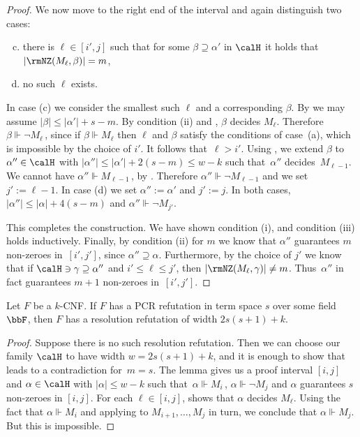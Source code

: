 \begin{proof}
We now move to the right end of the interval and 
again distinguish two cases:
\begin{enumerate}[(a)]\setcounter{enumi}{2}
\item there is $\ell \in [i',j]$ such that for some $\beta \supseteq \alpha'$ 
in $\calH$ it holds that $|\rmNZ(M_\ell, \beta)| = m$,
\item no such $\ell$ exists.
\end{enumerate}
In case (c) we consider the smallest such $\ell$ and a corresponding $\beta$.
By  we may assume $|\beta| \le |\alpha'|+s-m$.
By condition (ii) and , $\beta$ decides $M_{\ell}$.
Therefore $\beta \Vdash \neg M_{\ell}$\,, since if 
$\beta \Vdash M_{\ell}$ then $\ell$ and $\beta$ satisfy the conditions
of case~(a), which is impossible by the choice of $i'$.
It follows that~$\ell > i'$. 
Using , we extend $\beta$
to $\alpha'' \in \calH$ with $|\alpha''| \le |\alpha'| + 2(s-m) \le w-k$ 
such that~$\alpha''$ decides~$M_{\ell - 1}$.
We cannot have $\alpha'' \Vdash M_{\ell-1}$\,, by . 
Therefore $\alpha'' \Vdash \neg M_{\ell-1}$
and we set $j' := \ell -1$.
In case (d) we set $\alpha'' :=\alpha'$ and  $j' := j$. 
In both cases, $|\alpha''| \le |\alpha| + 4(s-m)$ and $\alpha'' \Vdash \neg M_{j'}$.


This completes the construction. We have shown condition (i),
and condition (iii) holds inductively. 
Finally, by condition (ii) for $m$ we know that $\alpha''$
guarantees $m$ non-zeroes in~$[i',j']$, since $\alpha'' \supseteq \alpha$.
Furthermore,
by the choice of $j'$ we know that if $\calH \ni \gamma \supseteq \alpha''$ and $i' \le \ell \le j'$, then
$|\rmNZ(M_{\ell}, \gamma)| \neq m$. 
Thus~$\alpha''$ in fact guarantees $m+1$ non-zeroes in~$[i',j']$.
\end{proof}



\begin{theorem} \label{thm:first}
Let $F$ be a $k$-CNF. If $F$ has a PCR refutation in term
space $s$ 
over some field~$\bbF$, 
then $F$ has a resolution refutation of width $2s(s+1)+k$. 
\end{theorem}

\begin{proof}
Suppose there is no such resolution refutation. Then 
we can choose our family $\calH$ to have width $w=2s(s+1)+k$,
and it is enough to show that  leads to a contradiction
for~$m=s$. The lemma gives us 
a proof interval $[i, j]$
and $\alpha \in \calH$
with $|\alpha| \le w-k$ such that~$\alpha \Vdash M_i$\,, $\alpha \Vdash \neg M_j$
and $\alpha$ guarantees $s$ non-zeroes in $[i,j]$. 
For each $\ell \in[i, j]$,
shows that
$\alpha$ decides $M_\ell$. Using the fact that $\alpha \Vdash M_i$ and applying  to $M_{i+1}, \dots, M_j$ in turn, 
we conclude that $\alpha \Vdash M_j$. But this is impossible.
\end{proof}



